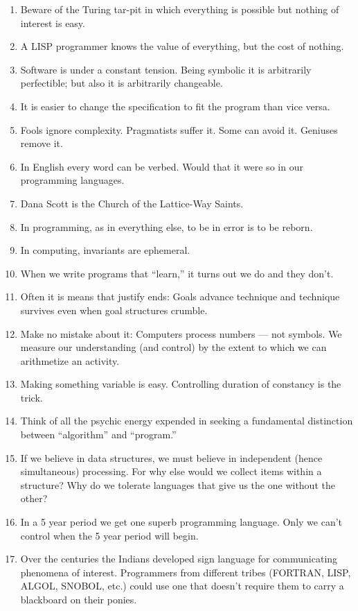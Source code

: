 \documentclass[letterpaper,11pt]{article}
\begin{document}
\begin{multicols}{2}
\begin{enumerate}[wide=0pt,label=\textbf{\arabic*.}]
\item Beware of the Turing tar-pit in which everything is possible but nothing of interest is easy.
\item A LISP programmer knows the value of everything, but the cost of nothing.
\item Software is under a constant tension. Being symbolic it is arbitrarily perfectible; but also it is arbitrarily changeable.
\item It is easier to change the specification to fit the program than vice versa.
\item Fools ignore complexity. Pragmatists suffer it. Some can avoid it. Geniuses remove it.
\item In English every word can be verbed. Would that it were so in our programming languages.
\item Dana Scott is the Church of the Lattice-Way Saints.
\item In programming, as in everything else, to be in error is to be reborn.
\item In computing, invariants are ephemeral.
\item When we write programs that ``learn,'' it turns out we do and they don't.
\item Often it is means that justify ends: Goals advance technique and technique survives even when goal structures crumble.
\item Make no mistake about it: Computers process numbers --- not symbols. We measure our understanding (and control) by the extent to which we can arithmetize an activity.
\item Making something variable is easy. Controlling duration of constancy is the trick.
\item Think of all the psychic energy expended in seeking a fundamental distinction between ``algorithm'' and ``program.''
\item If we believe in data structures, we must believe in independent (hence simultaneous) processing. For why else would we collect items within a structure? Why do we tolerate languages that give us the one without the other?
\item In a 5 year period we get one superb programming language. Only we can't control when the 5 year period will begin.
\item Over the centuries the Indians developed sign language for communicating phenomena of interest. Programmers from different tribes (FORTRAN, LISP, ALGOL, SNOBOL, etc.) could use one that doesn't require them to carry a blackboard on their ponies.

\end{enumerate}
\end{multicols}
\end{document}
